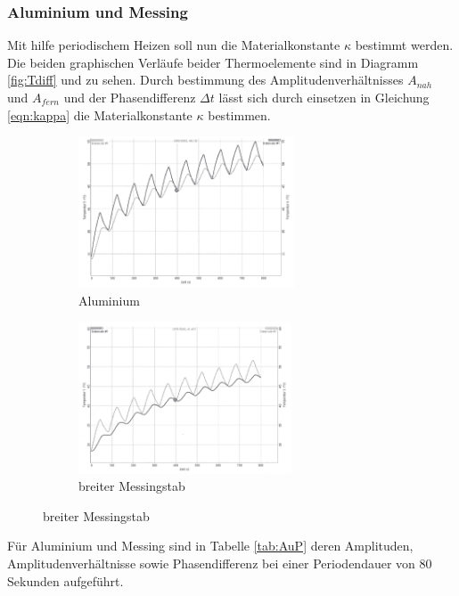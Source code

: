 \subsubsection{Aluminium und Messing}
Mit hilfe periodischem Heizen soll nun die Materialkonstante $\kappa$ bestimmt werden. Die beiden graphischen Verläufe beider Thermoelemente sind in Diagramm \ref{fig:Tdiff}  und  zu sehen. Durch bestimmung des Amplitudenverhältnisses $A_{nah}$ und $A_{fern}$ und der Phasendifferenz $\Delta t$ lässt sich durch einsetzen in Gleichung \ref{eqn:kappa} die Materialkonstante $\kappa$ bestimmen. 
\begin{figure}
        \centering
        \caption{Temperatur der Thermoelemente bei periodischem Heizem}
        \label{fig:Tdiff}
	\begin{subfigure}{0.48\textwidth}
                \centering
                \includegraphics[height=4.5cm]{./Graph_1.png}
                \caption{Aluminium}
		\label{fig:Graph1}
        \end{subfigure}
        \begin{subfigure}{0.48\textwidth}
                \centering
                \includegraphics[height=4.5cm]{./Graph_2.png}
                \caption{breiter Messingstab}
		\label{fig:Graph2}
        \end{subfigure}
\end{figure}
Für Aluminium und Messing sind in Tabelle \ref{tab:AuP} deren Amplituden, Amplitudenverhältnisse sowie Phasendifferenz bei einer Periodendauer von 80 Sekunden aufgeführt. 
